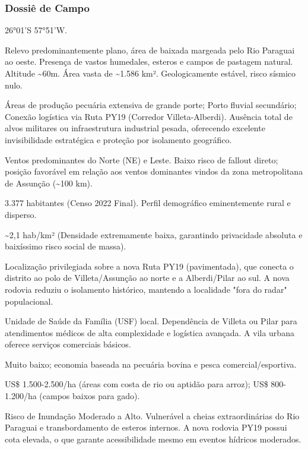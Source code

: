 \subsubsection{Dossiê de Campo}
\begin{description}[style=nextline,leftmargin=0.5cm,font=\bfseries]
\item[Coordenadas]  26°01'S 57°51'W.
\item[Topografia]  Relevo predominantemente plano, área de baixada margeada pelo Rio Paraguai ao oeste. Presença de vastos humedales, esteros e campos de pastagem natural. Altitude \textasciitilde 60m. Área vasta de \textasciitilde 1.586 km². Geologicamente estável, risco sísmico nulo.
\item[Alvos Estratégicos]  Áreas de produção pecuária extensiva de grande porte; Porto fluvial secundário; Conexão logística via Ruta PY19 (Corredor Villeta-Alberdi). Ausência total de alvos militares ou infraestrutura industrial pesada, oferecendo excelente invisibilidade estratégica e proteção por isolamento geográfico.
\item[Fallout]  Ventos predominantes do Norte (NE) e Leste. Baixo risco de fallout direto; posição favorável em relação aos ventos dominantes vindos da zona metropolitana de Assunção (\textasciitilde 100 km).
\item[População]  3.377 habitantes (Censo 2022 Final). Perfil demográfico eminentemente rural e disperso.
\item[Densidade]  \textasciitilde 2,1 hab/\allowbreak km² (Densidade extremamente baixa, garantindo privacidade absoluta e baixíssimo risco social de massa).
\item[Vias de Acesso]  Localização privilegiada sobre a nova Ruta PY19 (pavimentada), que conecta o distrito ao polo de Villeta/\allowbreak Assunção ao norte e a Alberdi/\allowbreak Pilar ao sul. A nova rodovia reduziu o isolamento histórico, mantendo a localidade "fora do radar" populacional.
\item[Serviços]  Unidade de Saúde da Família (USF) local. Dependência de Villeta ou Pilar para atendimentos médicos de alta complexidade e logística avançada. A vila urbana oferece serviços comerciais básicos.
\item[Custo de Vida]  Muito baixo; economia baseada na pecuária bovina e pesca comercial/\allowbreak esportiva.
\item[Preço da Terra]  US\$ 1.500-2.500/\allowbreak ha (áreas com costa de rio ou aptidão para arroz); US\$ 800-1.200/\allowbreak ha (campos baixos para gado).
\item[Hidrologia]  Risco de Inundação Moderado a Alto. Vulnerável a cheias extraordinárias do Rio Paraguai e transbordamento de esteros internos. A nova rodovia PY19 possui cota elevada, o que garante acessibilidade mesmo em eventos hídricos moderados.

\end{description}
